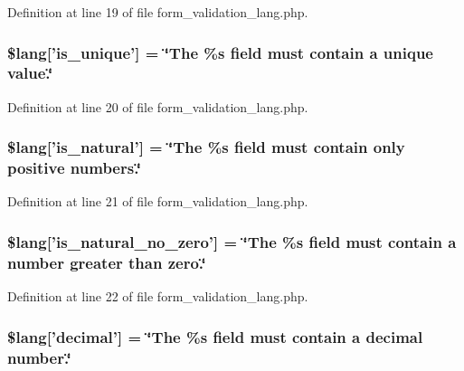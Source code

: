 Definition at line 19 of file form\-\_\-validation\-\_\-lang.\-php.

\subsubsection[{\$lang}]{\setlength{\rightskip}{0pt plus 5cm}\$lang['is\-\_\-unique'] = \char`\"{}The \%{\bf s} field must contain {\bf a} unique value.\char`\"{}}\label{form__validation__lang_8php_aadc3e586aaac175b851ee4bcd0c26ef2}


Definition at line 20 of file form\-\_\-validation\-\_\-lang.\-php.

\subsubsection[{\$lang}]{\setlength{\rightskip}{0pt plus 5cm}\$lang['is\-\_\-natural'] = \char`\"{}The \%{\bf s} field must contain only positive numbers.\char`\"{}}\label{form__validation__lang_8php_a0d61ebbd2ae667c2cccf29c316b6a382}


Definition at line 21 of file form\-\_\-validation\-\_\-lang.\-php.

\subsubsection[{\$lang}]{\setlength{\rightskip}{0pt plus 5cm}\$lang['is\-\_\-natural\-\_\-no\-\_\-zero'] = \char`\"{}The \%{\bf s} field must contain {\bf a} number greater than zero.\char`\"{}}\label{form__validation__lang_8php_a0956fbaf56ed9b9598a43ea9e9014727}


Definition at line 22 of file form\-\_\-validation\-\_\-lang.\-php.

\subsubsection[{\$lang}]{\setlength{\rightskip}{0pt plus 5cm}\$lang['decimal'] = \char`\"{}The \%{\bf s} field must contain {\bf a} decimal number.\char`\"{}}\label{form__validation__lang_8php_a1926dbdd7b5919a5e1a966d6ec18c9e4}


